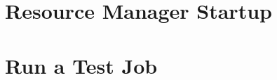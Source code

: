 \documentclass{ohpc-doc}
\begin{document}
\chapter{Resource Manager Startup} \label{sec:rms_startup}


\chapter{Run a Test Job} \label{sec:test_job}


\appendix







\end{document}
